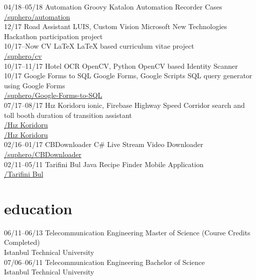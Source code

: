 \documentclass[]{../friggeri-cv} %
\begin{document}
\begin{entrylist}
\entry
{04/18--05/18}
{Automation}
{Groovy}
{Katalon Automation Recorder Cases
\\\href{https://github.com/suphero/automation}{\faGithub/suphero/automation}}
\\
\entry
{12/17}
{Road Assistant}
{LUIS, Custom Vision}
{Microsoft New Technologies Hackathon participation project}
\\
\entry
{10/17--Now}
{CV}
{\LaTeX}
{LaTeX based curriculum vitae project
\\\href{https://github.com/suphero/cv}{\faGithub/suphero/cv}}
\\
\entry
{10/17--11/17}
{Hotel OCR}
{OpenCV, Python}
{OpenCV based Identity Scanner}
\\
\entry
{10/17}
{Google Forms to SQL}
{Google Forms, Google Scripts}
{SQL query generator using Google Forms
\\\href{https://github.com/suphero/Google-Forms-to-SQL}{\faGithub/suphero/Google-Forms-to-SQL}}
\\
\entry
{07/17--08/17}
{Hız Koridoru}
{ionic, Firebase}
{Highway Speed Corridor search and toll booth duration of transition assistant
\\\href{https://play.google.com/store/apps/details?id=com.harunsokullu.speedcorridor}{\faAndroid/Hız Koridoru}
\\\href{https://itunes.apple.com/tr/app/h\%C4\%B1z-koridoru/id1265151812}{\faApple/Hız Koridoru}}
\\
\entry
{02/16--01/17}
{CBDownloader}
{C\#}
{Live Stream Video Downloader
\\\href{https://github.com/suphero/CBDownloader}{\faGithub/suphero/CBDownloader}}
\\
\entry
{02/11--05/11}
{Tarifini Bul}
{Java}
{Recipe Finder Mobile Application
\\\href{https://play.google.com/store/apps/details?id=com.tarifinibul}{\faAndroid/Tarifini Bul}}

\end{entrylist}

\section{education}

\begin{entrylist}

\entry
{06/11--06/13}
{Telecommunication Engineering}{}
{Master of Science (Course Credits Completed)
\\Istanbul Technical University}
\\
\entry
{07/06--06/11}
{Telecommunication Engineering}{}
{Bachelor of Science
\\Istanbul Technical University}
	
\end{entrylist}
\end{document}
